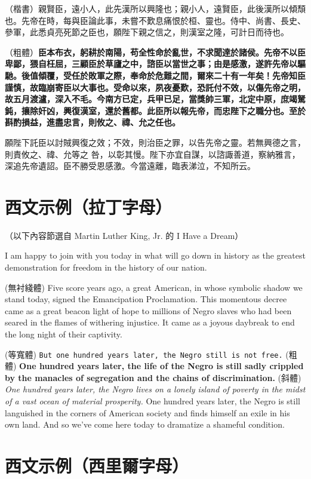 \documentclass[
a4paper,
oneside,
12pt,
]{book}
\begin{document}
（楷書）{\kaishu 親賢臣，遠小人，此先漢所以興隆也；親小人，遠賢臣，此後漢所以傾頹也。先帝在時，每與臣論此事，未嘗不歎息痛恨於桓、靈也。侍中、尚書、長史、參軍，此悉貞亮死節之臣也，願陛下親之信之，則漢室之隆，可計日而待也。}

（粗體）\textbf{臣本布衣，躬耕於南陽，苟全性命於亂世，不求聞達於諸侯。先帝不以臣卑鄙，猥自枉屈，三顧臣於草廬之中，諮臣以當世之事；由是感激，遂許先帝以驅馳。後值傾覆，受任於敗軍之際，奉命於危難之間，爾來二十有一年矣！先帝知臣謹慎，故臨崩寄臣以大事也。受命以來，夙夜憂歎，恐託付不效，以傷先帝之明，故五月渡瀘，深入不毛。今南方已定，兵甲已足，當獎帥三軍，北定中原，庶竭駑鈍，攘除奸凶，興復漢室，還於舊都。此臣所以報先帝，而忠陛下之職分也。至於斟酌損益，進盡忠言，則攸之、禕、允之任也。}

願陛下託臣以討賊興復之效；不效，則治臣之罪，以告先帝之靈。若無興德之言，則責攸之、禕、允等之 咎，以彰其慢。陛下亦宜自謀，以諮諏善道，察納雅言，深追先帝遺詔。臣不勝受恩感激。今當遠離，臨表涕泣，不知所云。

\section{西文示例（拉丁字母）}

（以下內容節選自 Martin Luther King, Jr. 的 I Have a Dream）

I am happy to join with you today in what will go down in history as the greatest demonstration for freedom in the history of our nation.

(無衬綫體) \textsf{Five score years ago, a great American, in whose symbolic shadow we stand today, signed the Emancipation Proclamation. This momentous decree came as a great beacon light of hope to millions of Negro slaves who had been seared in the flames of withering injustice. It came as a joyous daybreak to end the long night of their captivity.}

(等寬體) \texttt{But one hundred years later, the Negro still is not free.} (粗體) \textbf{One hundred years later, the life of the Negro is still sadly crippled by the manacles of segregation and the chains of discrimination.} (斜體) \textit{One hundred years later, the Negro lives on a lonely island of poverty in the midst of a vast ocean of material prosperity.} One hundred years later, the Negro is still languished in the corners of American society and finds himself an exile in his own land. And so we've come here today to dramatize a shameful condition.

\section{西文示例（西里爾字母）}
\end{document}
